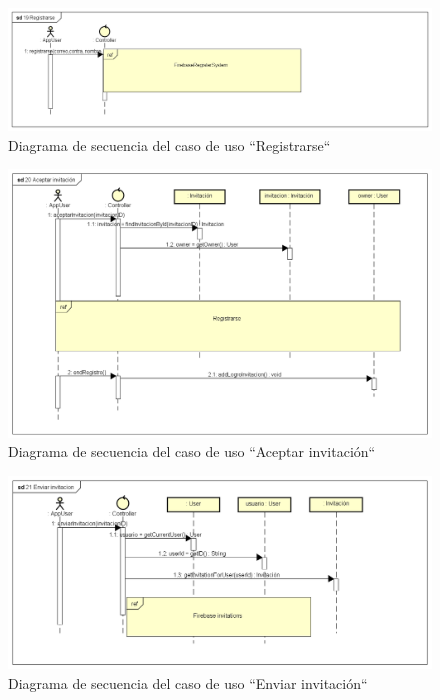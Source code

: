 \documentclass[twoside]{report}
\begin{document}
\begin{figure}[H]
\includegraphics[scale=0.5]{images/sequence/register}
\caption{Diagrama de secuencia del caso de uso “Registrarse“}
\end{figure}


\begin{figure}[H]
\includegraphics[scale=0.5]{images/sequence/acceptInvitation}
\caption{Diagrama de secuencia del caso de uso “Aceptar invitación“}
\end{figure}

\begin{figure}[H]
\includegraphics[scale=0.5]{images/sequence/sendInvitation}
\caption{Diagrama de secuencia del caso de uso “Enviar invitación“}
\end{figure}
\end{document}
